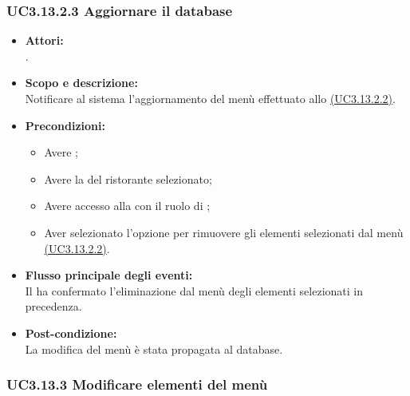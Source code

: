 \subsubsection{UC3.13.2.3 Aggiornare il database} \label{UC3.13.2.3}

\begin{itemize}
	\item \textbf{Attori:}
	\\.
	\item \textbf{Scopo e descrizione:} 
	\\Notificare al sistema l'aggiornamento del menù effettuato allo \hyperref[UC3.13.2.2]{(UC3.13.2.2)}.
	\item \textbf{Precondizioni:}
	\begin{itemize}
		\item Avere ;
		\item Avere la  del ristorante selezionato;
		\item Avere accesso alla  con il ruolo di ;
		\item Aver selezionato l'opzione per rimuovere gli elementi selezionati dal menù \hyperref[UC3.13.2.2]{(UC3.13.2.2)}.
	\end{itemize}
	\item \textbf{Flusso principale degli eventi:}
	\\Il {} ha confermato l'eliminazione dal menù degli elementi selezionati in precedenza.
	\item \textbf{Post-condizione:}
	\\La modifica del menù è stata propagata al database.
\end{itemize}

\subsubsection{UC3.13.3 Modificare elementi del menù} \label{UC3.13.3}

